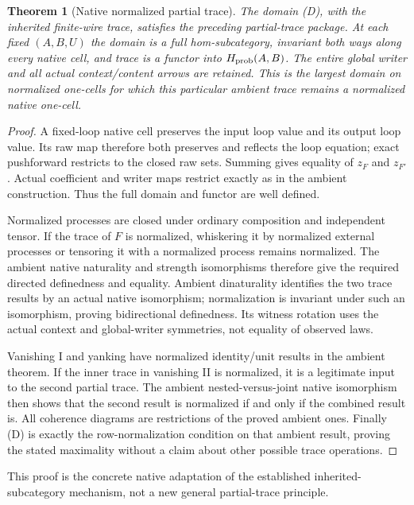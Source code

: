 \documentclass[11pt]{article}
\newtheorem{theorem}{Theorem}\newtheorem{proposition}[theorem]{Proposition}\newtheorem{lemma}[theorem]{Lemma}
\begin{document}
\begin{theorem}[Native normalized partial trace]
The domain (D), with the inherited finite-wire trace, satisfies the preceding partial-trace package. At each fixed $(A,B,U)$ the domain is a full hom-subcategory, invariant both ways along every native cell, and trace is a functor into $H_{\rm prob}(A,B)$. The entire global writer and all actual context/content arrows are retained. This is the largest domain on normalized one-cells for which this particular ambient trace remains a normalized native one-cell.
\end{theorem}
\begin{proof}
A fixed-loop native cell preserves the input loop value and its output loop value. Its raw map therefore both preserves and reflects the loop equation; exact pushforward restricts to the closed raw sets. Summing gives equality of $z_F$ and $z_{F'}$. Actual coefficient and writer maps restrict exactly as in the ambient construction. Thus the full domain and functor are well defined.

Normalized processes are closed under ordinary composition and independent tensor. If the trace of $F$ is normalized, whiskering it by normalized external processes or tensoring it with a normalized process remains normalized. The ambient native naturality and strength isomorphisms therefore give the required directed definedness and equality. Ambient dinaturality identifies the two trace results by an actual native isomorphism; normalization is invariant under such an isomorphism, proving bidirectional definedness. Its witness rotation uses the actual context and global-writer symmetries, not equality of observed laws.

Vanishing I and yanking have normalized identity/unit results in the ambient theorem. If the inner trace in vanishing II is normalized, it is a legitimate input to the second partial trace. The ambient nested-versus-joint native isomorphism then shows that the second result is normalized if and only if the combined result is. All coherence diagrams are restrictions of the proved ambient ones. Finally (D) is exactly the row-normalization condition on that ambient result, proving the stated maximality without a claim about other possible trace operations.
\end{proof}
This proof is the concrete native adaptation of the established inherited-subcategory mechanism, not a new general partial-trace principle.
\end{document}
